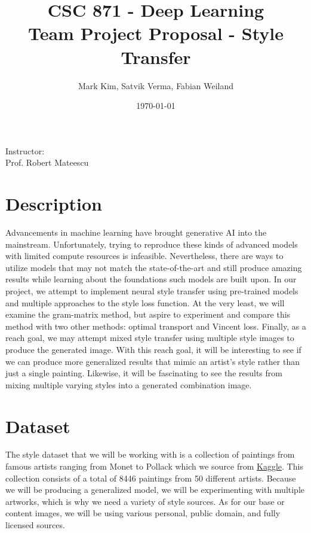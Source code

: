 \documentclass[12pt]{article}
\title{\textbf{CSC 871 - Deep Learning}\\\Large Team Project Proposal - Style Transfer}
\author{\large Mark Kim, Satvik Verma, Fabian Weiland}
\date{\today}
\begin{document}
\maketitle
\vspace{5mm}
\begin{center}
    Instructor:\\
    Prof. Robert Mateescu
\end{center}
\newpage

\section{Description}
Advancements in machine learning have brought generative AI into the mainstream.
Unfortunately, trying to reproduce these kinds of advanced models with limited
compute resources is infeasible.  Nevertheless, there are ways to utilize models
that may not match the state-of-the-art and still produce amazing results while
learning about the foundations such models are built upon.  In our project, we
attempt to implement neural style transfer using pre-trained models and multiple
approaches to the style loss function.  At the very least, we will examine the
gram-matrix method, but aspire to experiment and compare this method with two
other methods: optimal transport and Vincent loss.  Finally, as a reach goal, we
may attempt mixed style transfer using multiple style images to produce the
generated image.  With this reach goal, it will be interesting to see if we can
produce more generalized results that mimic an artist's style rather than just a
single painting.  Likewise, it will be fascinating to see the results from
mixing multiple varying styles into a generated combination image.

\section{Dataset}
The style dataset that we will be working with is a collection of paintings from famous
artists ranging from Monet to Pollack which we source from 
\href{https://www.kaggle.com/datasets/ikarus777/best-artworks-of-all-time}{Kaggle}.
This collection consists of a total of 8446 paintings from 50 different artists.
Because we will be producing a generalized model, we will be experimenting with
multiple artworks, which is why we need a variety of style sources.  As for our
base or content images, we will be using various personal, public domain, and
fully licensed sources.
\end{document}
